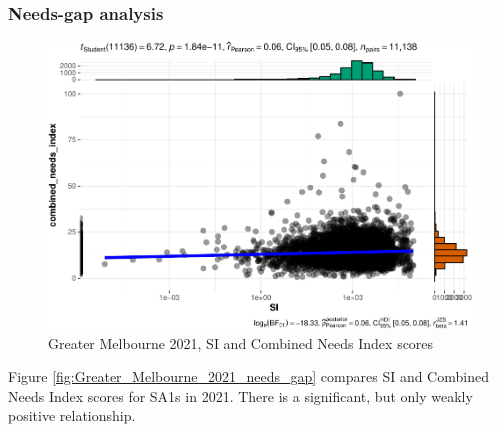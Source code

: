 \documentclass[preprint, 3p,
authoryear]{elsarticle} %
\begin{document}
\hypertarget{needs-gap-analysis}{%
\subsubsection{Needs-gap analysis}\label{needs-gap-analysis}}

\begin{figure}
\centering
\includegraphics{Leveraging_GTFS_to_assess_transit_supply_Transport_Geography_files/figure-latex/Greater_Melbourne_2021_needs_gap-1.pdf}
\caption{Greater Melbourne 2021, SI and Combined Needs Index scores}
\end{figure}

Figure \ref{fig:Greater_Melbourne_2021_needs_gap} compares SI and
Combined Needs Index scores for SA1s in 2021. There is a significant,
but only weakly positive relationship.

\begingroup\fontsize{8}{10}\selectfont
\end{document}
